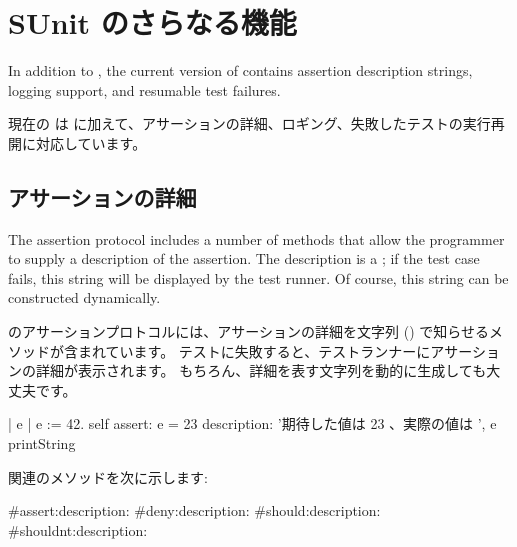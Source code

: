 \documentclass[a4paper,10pt,twoside]{book}
\begin{document}

\section{SUnit のさらなる機能}

In addition to , the current version of \sunit contains assertion
description strings, logging support, and resumable test failures.
\fi

現在の \sunit は  に加えて、アサーションの詳細、ロギング、失敗したテストの実行再開に対応しています。

\subsection{アサーションの詳細}

The  assertion protocol includes a
number of methods that allow the programmer to supply a description of the assertion.  The description is a ; if the test case
fails, this string will be displayed by the test runner.  Of
course, this string can be constructed dynamically.
\fi

 のアサーションプロトコルには、アサーションの詳細を文字列 () で知らせるメソッドが含まれています。
テストに失敗すると、テストランナーにアサーションの詳細が表示されます。
もちろん、詳細を表す文字列を動的に生成しても大丈夫です。

\begin{code}{}
| e |
e := 42.
self assert: e = 23
	description: '期待した値は 23 、実際の値は ', e printString
\end{code}

 関連のメソッドを次に示します:
\begin{code}{}
#assert:description:
#deny:description:
#should:description:
#shouldnt:description:
\end{code}
\end{document}
